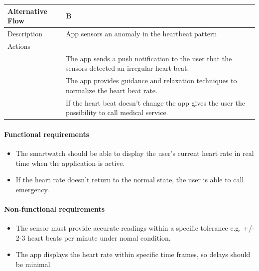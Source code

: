 \documentclass{article}
\begin{document}
\begin{center}
\begin{tabularx}{1.0\textwidth}{|>{\raggedright\arraybackslash}p{}|>{\raggedright\arraybackslash}X|}
			Alternative Flow & B \\ \hline
							Description & App sensors an anomaly in the heartbeat pattern  \\ \hline
							Actions & \\ \hline
							1 & The app sends a push notification to the user that the sensors detected an irregular heart beat. \\ \hline
							2 & The app provides guidance and relaxation techniques to normalize the heart beat rate. \\ \hline
							3 & If the heart beat doesn't change the app gives the user the possibility to call medical service. \\ \hline
		\end{tabularx}
	\end{center}
	\paragraph{Functional requirements}
		\begin{itemize}
			\item The smartwatch should be able to display the user's current heart rate in real time when the application is active.
			\item If the heart rate doesn't return to the normal state, the user is able to call emergency. 
		\end{itemize}
		
	\paragraph{Non-functional requirements}
		\begin{itemize}
			\item The sensor must provide accurate readings within a specific tolerance e.g. +/- 2-3 heart beats per minute under nomal condition. 
			\item The app displays the heart rate within specific time frames, so delays should be minimal
		\end{itemize}
		 \clearpage
\end{document}
